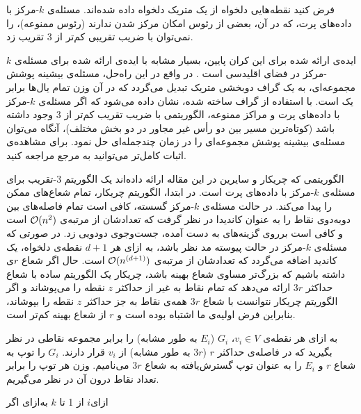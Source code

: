 
فرض کنید نقطه‌هایی دلخواه از یک متریک دلخواه داده شده‌اند.
مسئله‌ی $k$-مرکز با داده‌های پرت، که در آن، بعضی از رئوس امکان مرکز شدن ندارند (رئوس ممنوعه)، را نمی‌توان با ضریب تقریبی کم‌تر از $3$ تقریب زد.


ایده‌ی ارائه شده برای این کران پایین، بسیار مشابه با ایده‌ی ارائه شده برای مسئله‌ی $k$-مرکز در فضای اقلیدسی است .
در واقع در این راه‌حل، مسئله‌ی بیشینه پوشش مجموعه‌ای، به یک گراف دوبخشی متریک تبدیل می‌گردد که در آن وزن تمام یال‌ها برابر یک است.
با استفاده از گراف ساخته شده، نشان داده می‌شود که اگر مسئله‌ی $k$-مرکز با داده‌های پرت و مراکز ممنوعه، الگوریتمی با ضریب تقریب کم‌تر از $3$ وجود داشته باشد (کوتاه‌ترین مسیر بین دو رأس غیر مجاور در دو بخش مختلف)، آنگاه می‌توان مسئله‌ی بیشینه پوشش مجموعه‌ای را در زمان چندجمله‌ای حل نمود.
برای مشاهده‌ی اثبات کامل‌تر می‌توانید به مرجع  مراجعه کنید.


الگوریتمی که چریکار و سایرین در این مقاله ارائه داده‌اند یک الگوریتم $3$-تقریب برای مسئله‌ی $k$-مرکز با داده‌های پرت است.
در ابتدا، الگوریتم چریکار، تمام شعاع‌های ممکن را پیدا می‌کند.
در حالت مسئله‌ی $k$-مرکز گسسته، کافی است تمام فاصله‌های بین دوبه‌دوی نقاط را به عنوان کاندیدا در نظر گرفت که تعدادشان از مرتبه‌ی $\mathcal{O}(n^2)$ است و کافی است برروی گزینه‌های به دست آمده، جست‌وجوی دودویی زد.
در صورتی که مسئله‌ی $k$-مرکز در حالت پیوسته مد نظر باشد، به ازای هر $d+1$ نقطه‌ی دلخواه، یک کاندید اضافه می‌گردد که تعدادشان از مرتبه‌ی $\mathcal{O}(n^{(d+1)})$ است.
حال اگر شعاع $r$ی داشته باشیم که بزرگ‌تر مساوی شعاع بهینه باشد، چریکار یک الگوریتم ساده با شعاع حداکثر $3r$ ارائه می‌دهد که تمام نقاط به غیر از حداکثر $z$ نقطه را می‌پوشاند و اگر الگوریتم چریکار نتوانست با شعاع $3r$ همه‌ی نقاط به جز حداکثر $z$ نقطه را بپوشاند، بنابراین فرض اولیه‌ی ما اشتباه بوده است و $r$ از شعاع بهینه کم‌تر است.


به ازای هر نقطه‌ی $v_i \in V$، $G_i$ ($E_i$ به طور مشابه) را برابر مجموعه نقاطی در نظر بگیرید که در فاصله‌ی حداکثر $r$ ($3r$ به طور مشابه) از $v_i$ قرار دارند. $G_i$ را توپ به شعاع $r$ و $E_i$ را به عنوان توپ گسترش‌یافته به شعاع $3r$ می‌نامیم.
وزن هر توپ را برابر تعداد نقاط درون آن در نظر می‌گیریم.


‌ازای{$i$ از 1 تا $k$}
‌به‌ازای
‌اگر

